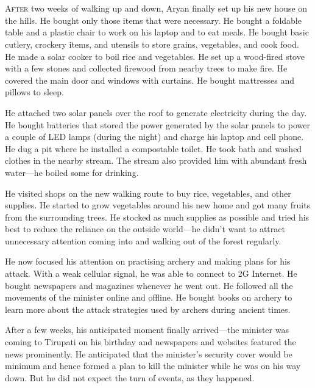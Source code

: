 \chapter{}

\lettrine{A}{fter} two weeks of walking up and down, Aryan finally set up his new house on
the hills. He bought only those items that were necessary. He bought a foldable
table and a plastic chair to work on his laptop and to eat meals. He bought
basic cutlery, crockery items, and utensils to store grains, vegetables, and
cook food. He made a solar cooker to boil rice and vegetables. He set up a
wood-fired stove with a few stones and collected firewood from nearby trees to
make fire. He covered the main door and windows with curtains. He bought
mattresses and pillows to sleep.

He attached two solar panels over the roof to generate electricity during the
day. He bought batteries that stored the power generated by the solar panels to
power a couple of LED lamps (during the night) and charge his laptop and cell
phone. He dug a pit where he installed a compostable toilet. He took bath and
washed clothes in the nearby stream. The stream also provided him with abundant
fresh water—he boiled some for drinking.

He visited shops on the new walking route to buy rice, vegetables, and other
supplies. He started to grow vegetables around his new home and got many fruits
from the surrounding trees. He stocked as much supplies as possible and tried his
best to reduce the reliance on the outside world—he didn't want to attract
unnecessary attention coming into and walking out of the forest regularly.

He now focused his attention on practising archery and making plans for his
attack. With a weak cellular signal, he was able to connect to 2G Internet. He
bought newspapers and magazines whenever he went out. He followed all the
movements of the minister online and offline. He bought books on archery to
learn more about the attack strategies used by archers during ancient times.

After a few weeks, his anticipated moment finally arrived—the minister was
coming to Tirupati on his birthday and newspapers and websites featured the news
prominently. He anticipated that the minister's security cover would be minimum
and hence formed a plan to kill the minister while he was on his way down. But
he did not expect the turn of events, as they happened.
